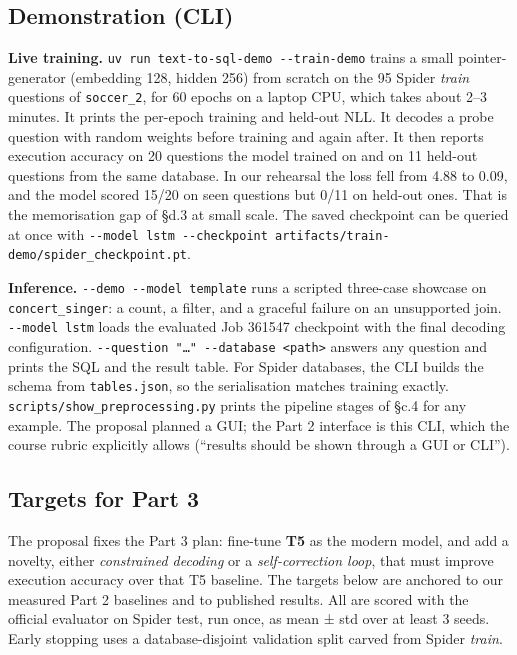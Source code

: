 \documentclass[
  10pt,
]{article}
\begin{document}
\subsection{Demonstration (CLI)}\label{demonstration-cli}

\textbf{Live training.}
\texttt{uv\ run\ text-to-sql-demo\ -\/-train-demo} trains a small
pointer-generator (embedding 128, hidden 256) from scratch on the 95
Spider \emph{train} questions of \texttt{soccer\_2}, for 60 epochs on a
laptop CPU, which takes about 2--3 minutes. It prints the per-epoch
training and held-out NLL. It decodes a probe question with random
weights before training and again after. It then reports execution
accuracy on 20 questions the model trained on and on 11 held-out
questions from the same database. In our rehearsal the loss fell from
4.88 to 0.09, and the model scored 15/20 on seen questions but 0/11 on
held-out ones. That is the memorisation gap of §d.3 at small scale. The
saved checkpoint can be queried at once with
\texttt{-\/-model\ lstm\ -\/-checkpoint\ artifacts/train-demo/spider\_checkpoint.pt}.

\textbf{Inference.} \texttt{-\/-demo\ -\/-model\ template} runs a
scripted three-case showcase on \texttt{concert\_singer}: a count, a
filter, and a graceful failure on an unsupported join.
\texttt{-\/-model\ lstm} loads the evaluated Job 361547 checkpoint with
the final decoding configuration.
\texttt{-\/-question\ "…"\ -\/-database\ \textless{}path\textgreater{}}
answers any question and prints the SQL and the result table. For Spider
databases, the CLI builds the schema from \texttt{tables.json}, so the
serialisation matches training exactly.
\texttt{scripts/show\_preprocessing.py} prints the pipeline stages of
§c.4 for any example. The proposal planned a GUI; the Part 2 interface
is this CLI, which the course rubric explicitly allows (``results should
be shown through a GUI or CLI'').

\subsection{Targets for Part 3}\label{targets-for-part-3}

The proposal fixes the Part 3 plan: fine-tune \textbf{T5} as the modern
model, and add a novelty, either \emph{constrained decoding} or a
\emph{self-correction loop}, that must improve execution accuracy over
that T5 baseline. The targets below are anchored to our measured Part 2
baselines and to published results. All are scored with the official
evaluator on Spider test, run once, as mean ± std over at least 3 seeds.
Early stopping uses a database-disjoint validation split carved from
Spider \emph{train}.
\end{document}
